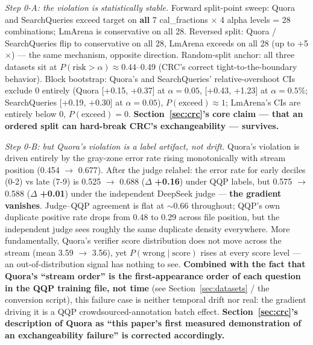 \documentclass[11pt]{article}
\begin{document}
\emph{Step 0-A: the violation is statistically stable.} Forward split-point sweep: Quora and SearchQueries exceed target on \textbf{all} 7 cal\_fractions $\times$ 4 alpha levels = 28 combinations; LmArena is conservative on all 28. Reversed split: Quora / SearchQueries flip to conservative on all 28, LmArena exceeds on all 28 (up to +5$\times$) --- the same mechanism, opposite direction. Random-split anchor: all three datasets sit at $P(\text{risk} > \alpha) \approx 0.44$--0.49 (CRC's correct tight-to-the-boundary behavior). Block bootstrap: Quora's and SearchQueries' relative-overshoot CIs exclude 0 entirely (Quora [+0.15, +0.37] at $\alpha=0.05$, [+0.43, +1.23] at $\alpha=0.5\%$; SearchQueries [+0.19, +0.30] at $\alpha=0.05$), $P(\text{exceed}) \approx 1$; LmArena's CIs are entirely below 0, $P(\text{exceed}) = 0$. \textbf{Section~\ref{sec:crc}'s core claim --- that an ordered split can hard-break CRC's exchangeability --- survives.}

\emph{Step 0-B: but Quora's violation is a label artifact, not drift.} Quora's violation is driven entirely by the gray-zone error rate rising monotonically with stream position (0.454 $\to$ 0.677). After the judge relabel: the error rate for early deciles (0-2) vs late (7-9) is 0.525 $\to$ 0.688 ($\Delta$ \textbf{+0.16}) under QQP labels, but 0.575 $\to$ 0.588 ($\Delta$ \textbf{+0.01}) under the independent DeepSeek judge --- \textbf{the gradient vanishes}. Judge--QQP agreement is flat at $\sim$0.66 throughout; QQP's own duplicate positive rate drops from 0.48 to 0.29 across file position, but the independent judge sees roughly the same duplicate density everywhere. More fundamentally, Quora's verifier score distribution does not move across the stream (mean 3.59 $\to$ 3.56), yet $P(\text{wrong} \mid \text{score})$ rises at every score level --- an out-of-distribution signal has nothing to see. \textbf{Combined with the fact that Quora's ``stream order'' is the first-appearance order of each question in the QQP training file, not time} (see Section~\ref{sec:datasets} / the conversion script), this failure case is neither temporal drift nor real: the gradient driving it is a QQP crowdsourced-annotation batch effect. \textbf{Section~\ref{sec:crc}'s description of Quora as ``this paper's first measured demonstration of an exchangeability failure'' is corrected accordingly.}
\end{document}
